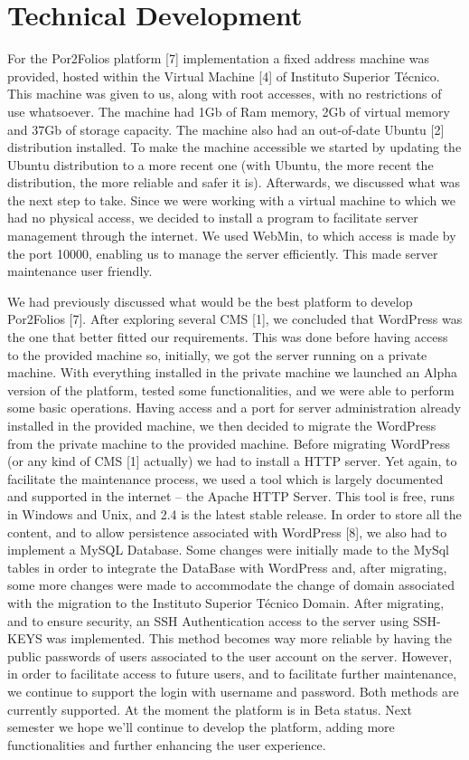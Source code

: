 \documentclass[a4paper,12pt,journal,twoside,compsoc]{PPIEEEtran}
\begin{document}
\section{Technical Development}
For the Por2Folios platform [7] implementation a fixed address machine was provided, hosted within the Virtual Machine [4] of Instituto Superior Técnico. This machine was given to us, along with root accesses, with no restrictions of use whatsoever. The machine had 1Gb of Ram memory, 2Gb of virtual memory and 37Gb of storage capacity. The machine also had an out-of-date Ubuntu [2] distribution installed. To make the machine accessible we started by updating the Ubuntu distribution to a more recent one (with Ubuntu, the more recent the distribution, the more reliable and safer it is). Afterwards, we discussed what was the next step to take. Since we were working with a virtual machine to which we had no physical access, we decided to install a program to facilitate server management through the internet.  We used WebMin, to which access is made by the port 10000, enabling us to manage the server efficiently. This made server maintenance user friendly.

We had previously discussed what would be the best platform to develop Por2Folios [7]. After exploring several \ac{CMS} [1], we concluded that WordPress was the one that better fitted our requirements. This was done before having access to the provided machine so, initially, we got the server running on a private machine. With everything installed in the private machine we launched an Alpha version of the platform, tested some functionalities, and we were able to perform some basic operations.
Having access and a port for server administration already installed in the provided machine, we then decided to migrate the WordPress from the private machine to the provided machine.
Before migrating WordPress (or any kind of \ac{CMS} [1] actually) we had to install a HTTP server. Yet again, to facilitate the maintenance process, we used a tool which is largely documented and supported in the internet -- the Apache HTTP Server. This tool is free, runs in Windows and Unix, and 2.4 is the latest stable release. 
In order to store all the content, and to allow persistence associated with WordPress [8], we also had to implement a MySQL Database. Some changes were initially made to the MySql tables in order to integrate the DataBase with WordPress and, after migrating, some more changes were made to accommodate the change of domain associated with the migration to the Instituto Superior Técnico Domain.
After migrating, and to ensure security, an SSH Authentication access to the server using SSH-KEYS was implemented. This method becomes way more reliable by having the public passwords of users associated to the user account on the server. However, in order to facilitate access to future users, and to facilitate further maintenance, we continue to support the login with username and password. Both methods are currently supported.
At the moment the platform is in Beta status. Next semester we hope we'll continue to develop the platform, adding more functionalities and further enhancing the user experience.
\end{document}
